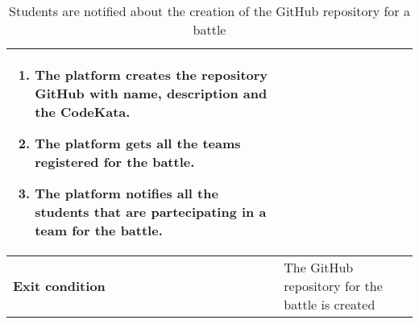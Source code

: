 \begin{enumerate}[label=\textbf{UC\arabic*}:,ref=UC\arabic*,leftmargin=1.3cm]
{\begin{table}[H]
\begin{tabular}{|l|p{11.9cm}|}
\begin{enumerate}[label=\arabic*.]
                              \item The platform creates the repository GitHub with name, description and the CodeKata.
                              \item The platform gets all the teams registered for the battle.
                              \item The platform notifies all the students that are partecipating in a team for the battle.
                        \end{enumerate}                        \\\hline
                        \textbf{Exit condition}  & The GitHub repository for the battle is created                                                          \\\hline
                  \end{tabular}
                  \caption{Students are notified about the creation of the GitHub repository for a battle  }
                  \label{table:Students are notified about the creation of the GitHub repository for a battle}
            \end{table}
            \begin{adjustbox}{
                        max size={\textwidth}{},
                        caption={Students are notified about the creation of the GitHub repository for a battle},
                        label={fig:Students are notified about the creation of the GitHub repository for a battle},
                        figure=H}
                  \centering
            \end{adjustbox}
            \pagebreak
      }
\end{enumerate}
